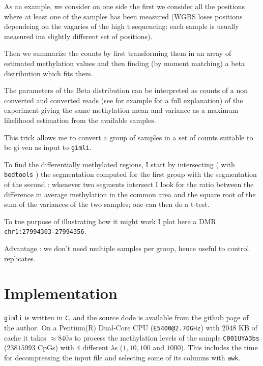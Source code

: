 \documentclass[12pt]{amsart}
\newcommand{\gimli}{\texttt{gimli}}
\begin{document}
As an example, we consider on one side the 
first we consider all the positions where at least one of the samples has been measured
(WGBS loses positions dependeing on the vagaries of the high t sequencing: each sample
is usually measured ina slightly different set of positions).

Then we summarize the counts by first transforming them in an array of estimated methylation
values and then finding (by moment matching) a beta distribution which fits them.

The parameters of the Beta distribution can be interpreted as counts of 
a non converted and converted reads (see for example \cite{methyldiff} for a full explanation) 
of the experiment giving the same methylation mean 
and variance as a maximum likelihood estimation from the available samples.

This trick allows me to convert a group of samples in a set of counts suitable to be gi
ven as input to \gimli{}.

To find the differentially methylated regions, I start by intersecting
( with \texttt{bedtools}\cite{bedtools} ) the segmentation computed for the first group
with the segmentation of the second : whenever two segments intersect I look
for the ratio between the difference in average methylation in the common area 
and the square root of the sum of the variances of the two samples; one can then
do a t-test.

To tue purpose of illustrating how it might work I plot here a DMR 
\texttt{chr1:27994303-27994356}.

Advantage : we don't need multiple samples per group, hence useful to control
replicates.

\section{Implementation}

\gimli{} is written in \texttt{C}, and the source
dode is available from the github page of the author. 
On a Pentium(R) Dual-Core  CPU (\texttt{E5400@2.70GHz})
with $2048$ KB of cache it takes $\approx 840s$ to process the 
methylation levels of the sample \texttt{C001UYA3bs} ($23815993$ CpGs) 
with $4$ different $\lambda$s ($1,10,100$ and $1000$).
This includes the time for decompressing the input file and selecting some of its columns
with \texttt{awk}.




\end{document}
